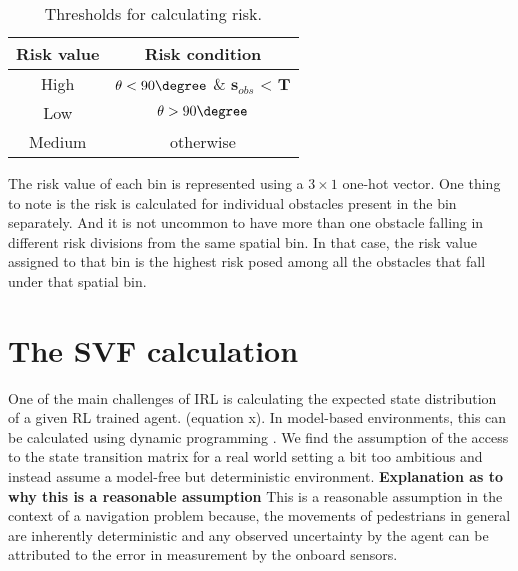 \begin{table}[htbp]
	\caption{Thresholds for calculating risk.}
	\label{risk-threshold-table}
	\begin{center}
		\renewcommand{\arraystretch}{1.3}
		\begin{tabular}{|c|c|}
			\hline
			Risk value & Risk condition \\
			\hline
			High & $\theta < 90\degree$ \&  $\mathbf{s}_{obs}$ < $\mathbf{T}$   \\
			
			Low & $\theta > 90\degree$\\
			
			Medium & otherwise \\
			\hline
		\end{tabular}
	\end{center}
\end{table}
The risk value of each bin is represented using a $3 \times 1$ one-hot vector. One thing to note is the risk is calculated for individual obstacles present in the bin separately. And it is not uncommon to have more than one obstacle falling in different risk divisions from the same spatial bin. In that case, the risk value assigned to that bin is the highest risk posed among all the obstacles that fall under that spatial bin.
\begin{figure}[!htbp]
\end{figure}

\section*{The SVF calculation}
One of the main challenges of IRL is calculating the expected state distribution of a given RL trained agent. (equation x). In model-based environments, this can be calculated using dynamic programming \cite{wulfmeier-deepirl}. We find the assumption of the access to the state transition matrix for a real world setting a bit too ambitious and instead assume a model-free but deterministic environment. \textbf{Explanation as to why this is a reasonable assumption} This is a reasonable assumption in the context of a navigation problem because, the movements of pedestrians in general are inherently deterministic and any observed uncertainty by the agent can be attributed to the error in measurement by the onboard sensors.\\


